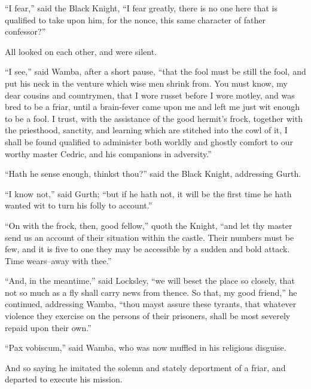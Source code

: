 ``I fear,'' said the Black Knight, ``I fear greatly, there is no one
here that is qualified to take upon him, for the nonce, this same
character of father confessor?''

All looked on each other, and were silent.

``I see,'' said Wamba, after a short pause, ``that the fool must be
still the fool, and put his neck in the venture which wise men shrink
from. You must know, my dear cousins and countrymen, that I wore russet
before I wore motley, and was bred to be a friar, until a brain-fever
came upon me and left me just wit enough to be a fool. I trust, with the
assistance of the good hermit's frock, together with the priesthood,
sanctity, and learning which are stitched into the cowl of it, I shall
be found qualified to administer both worldly and ghostly comfort to our
worthy master Cedric, and his companions in adversity.''

``Hath he sense enough, thinkst thou?'' said the Black Knight,
addressing Gurth.

``I know not,'' said Gurth; ``but if he hath not, it will be the first
time he hath wanted wit to turn his folly to account.''

``On with the frock, then, good fellow,'' quoth the Knight, ``and let
thy master send us an account of their situation within the castle.
Their numbers must be few, and it is five to one they may be accessible
by a sudden and bold attack. Time wears--away with thee.''

``And, in the meantime,'' said Locksley, ``we will beset the place so
closely, that not so much as a fly shall carry news from thence. So
that, my good friend,'' he continued, addressing Wamba, ``thou mayst
assure these tyrants, that whatever violence they exercise on the
persons of their prisoners, shall be most severely repaid upon their
own.''

``Pax vobiscum,'' said Wamba, who was now muffled in his religious
disguise.

And so saying he imitated the solemn and stately deportment of a friar,
and departed to execute his mission.
